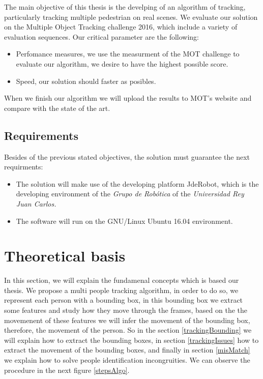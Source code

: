 \documentclass[12pt, a4paper, titlepage,twoside,openright]{article}
\begin{document}
The main objective of this thesis is the develping of an algorithm of tracking, particularly tracking multiple pedestrian on real scenes. We evaluate our solution on the Multiple Object Tracking challenge 2016, which include a variety of evaluation sequences. Our critical parameter are the following:

\begin{itemize}

\item Perfomance measures, we use the measurment of the MOT \cite{mot} challenge to evaluate our algorithm, we desire to have the highest possible score. 

\item Speed, our solution should faster as posibles.

\end{itemize}

When we finish our algorithm we will upload the results to MOT's website and compare with the state of the art.

\subsection{Requirements}

Besides of the previous stated objectives, the solution must guarantee the next requirments: 

\begin{itemize}

\item The solution will make use of the developing platform JdeRobot, which is the developing environment of the \textit{Grupo de Robótica} of the \textit{Universidad  Rey Juan Carlos.} 

\item The software will run on the GNU/Linux Ubuntu 16.04 environment.


\end{itemize}





\section{Theoretical basis}\label{TheoriecArch}




In this section, we will explain the fundamenal concepts which is based our thesis. We propose a multi people tracking algorithm, in order to do so, we represent each person with a bounding box, in this bounding box we extract some features and study how they move through the frames, based on the the movemenent of these features we will infer the movement of the bounding box, therefore, the movement of the person. So in the section \ref{trackingBounding} we will explain how to extract the bounding boxes, in section \ref{trackingIssues} how to extract the movement of the bounding boxes, and finally in section \ref{misMatch} we explain how to solve people identification incongruities. We can observe the procedure in the next figure \ref{stepsAlgo}.
\end{document}
